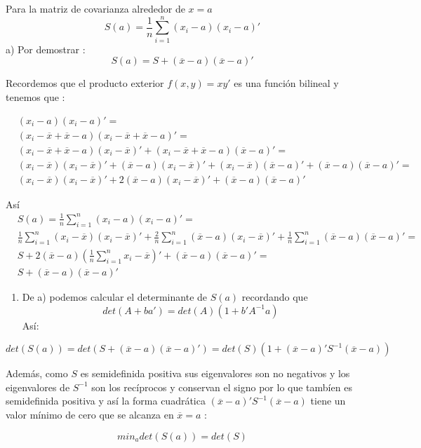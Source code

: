 \documentclass[
]{article}
\providecommand{\tightlist}{%
  \setlength{\itemsep}{0pt}\setlength{\parskip}{0pt}}
\begin{document}
Para la matriz de covarianza alrededor de \(x=a\)
\[S(a) = \frac{1}{n}\sum_{i=1}^{n} (x_{i}-a)(x_{i}-a)' \] a) Por
demostrar : \[S(a) = S + (\overline{x} - a )(\overline{x} - a )' \]

Recordemos que el producto exterior \(f(x,y) = xy'\) es una función
bilineal y tenemos que :

\begin{align*}
&(x_{i}-a)(x_{i}-a)' = \\
&(x_{i}-\overline{x}+\overline{x}-a)(x_{i}-\overline{x}+\overline{x}-a)' = \\ &(x_{i}-\overline{x}+\overline{x}-a)(x_{i}-\overline{x})' + (x_{i}-\overline{x}+\overline{x}-a)(\overline{x}-a)' = \\
&(x_{i}-\overline{x})(x_{i}-\overline{x})'+ (\overline{x}-a)(x_{i}-\overline{x})'+ (x_{i}-\overline{x})(\overline{x}-a)'+ (\overline{x}-a)(\overline{x}-a)' = \\
&(x_{i}-\overline{x})(x_{i}-\overline{x})'+ 2(\overline{x}-a)(x_{i}-\overline{x})'+ (\overline{x}-a)(\overline{x}-a)'
\end{align*}

Así \begin{align*}
&S(a) = \frac{1}{n}\sum_{i=1}^{n} (x_{i}-a)(x_{i}-a)' =\\
&\frac{1}{n}\sum_{i=1}^{n}(x_{i}-\overline{x})(x_{i}-\overline{x})'+ \frac{2}{n}\sum_{i=1}^{n}(\overline{x}-a)(x_{i}-\overline{x})'+ \frac{1}{n}\sum_{i=1}^{n}(\overline{x}-a)(\overline{x}-a)' = \\
&S + 2(\overline{x}-a)(\frac{1}{n}\sum_{i=1}^{n}x_{i}-\overline{x})'+(\overline{x}-a)(\overline{x}-a)' = \\
&S + (\overline{x}-a)(\overline{x}-a)'
\end{align*}

\begin{enumerate}
\def\labelenumi{\alph{enumi})}
\setcounter{enumi}{1}
\tightlist
\item
  De a) podemos calcular el determinante de \(S(a)\) recordando que
  \[det(A+ba') = det(A)(1+b'A^{-1}a)\] Así:
\end{enumerate}

\[det(S(a)) = det(S+(\overline{x}-a)(\overline{x}-a)') = det(S)(1+(\overline{x}-a)'S^{-1}(\overline{x}-a))\]

Además, como \(S\) es semidefinida positiva sus eigenvalores son no
negativos y los eigenvalores de \(S^{-1}\) son los recíprocos y
conservan el signo por lo que tambíen es semidefinida positiva y así la
forma cuadrática \((\overline{x}-a)'S^{-1}(\overline{x}-a)\) tiene un
valor mínimo de cero que se alcanza en \(\overline{x} = a\) :

\[min_{a}det(S(a)) = det(S)\]
\end{document}
